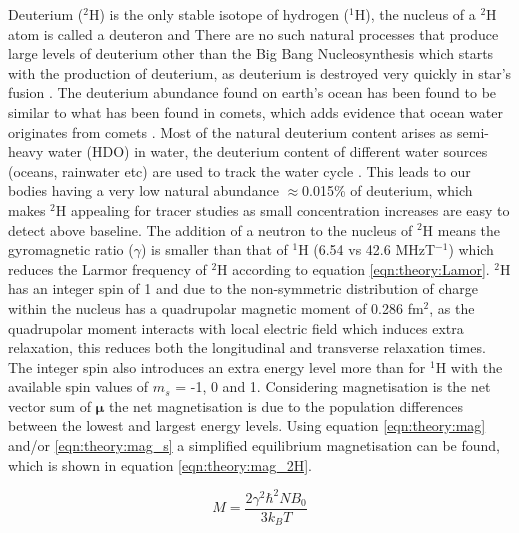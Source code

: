 \documentclass[class=article, crop=false]{standalone}
\begin{document}
Deuterium ($^2$H) is the only stable isotope of hydrogen ($^1$H), the nucleus of a $^2$H atom is called a deuteron and There are no such natural processes that produce large levels of deuterium other than the Big Bang Nucleosynthesis which starts with the production of deuterium, as deuterium is destroyed very quickly in star's fusion \cite{Patrignani2016ReviewPhysics}. The deuterium abundance found on earth's ocean has been found to be similar to what has been found in comets, which adds evidence that ocean water originates from comets \cite{Hersant2001APlanets}. Most of the natural deuterium content arises as semi-heavy water (HDO) in water, the deuterium content of different water sources (oceans, rainwater etc) are used to track the water cycle \cite{Bowen2019IsotopesApplications}. This leads to our bodies having a very low natural abundance $\approx$0.015\% of deuterium, which makes $^2$H appealing for tracer studies as small concentration increases are easy to detect above baseline. The addition of a neutron to the nucleus of $^2$H means the gyromagnetic ratio ($\gamma$) is smaller than that of $^1$H (6.54 vs 42.6 MHzT$^{-1}$) which reduces the Larmor frequency of $^2$H according to equation \ref{eqn:theory:Lamor}. $^2$H has an integer spin of 1 and due to the non-symmetric distribution of charge within the nucleus has a quadrupolar magnetic moment of 0.286 fm$^2$, as the quadrupolar moment interacts with local electric field which induces extra relaxation, this reduces both the longitudinal and transverse relaxation times. The integer spin also introduces an extra energy level more than for $^1$H with the available spin values of $m_s$ = -1, 0 and 1. Considering magnetisation is the net vector sum of $\mathbf{\mu}$ the net magnetisation is due to the population differences between the lowest and largest energy levels. Using equation \ref{eqn:theory:mag} and/or \ref{eqn:theory:mag_s} a simplified equilibrium magnetisation can be found, which is shown in equation \ref{eqn:theory:mag_2H}.

\begin{equation}
    M = \frac{2\gamma^2 \hbar^2 N B_0}{3k_BT}
    \label{eqn:theory:mag_2H}
\end{equation}
\end{document}

